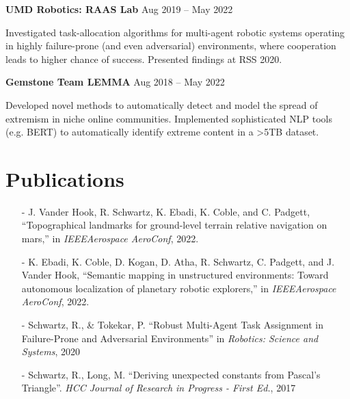 \documentclass[letterpaper,11pt]{article}
\begin{document}
\begin{minipage}[t]{0.42\textwidth}
  \noindent
  \textbf{UMD Robotics: RAAS Lab} \hspace{\fill} Aug 2019 -- May 2022

  \setlength{\parindent}{15pt}
  {\small Investigated task-allocation algorithms for multi-agent robotic systems operating in highly failure-prone (and even adversarial) environments, where cooperation leads to higher chance of success. Presented findings at RSS 2020.}

  \vspace*{6pt}

  \noindent
  \textbf{Gemstone Team LEMMA} \hspace{\fill} Aug 2018 -- May 2022
    
  \setlength{\parindent}{15pt}
  {\small Developed novel methods to automatically detect and model the spread of extremism in niche online communities. Implemented sophisticated NLP tools (e.g. BERT) to automatically identify extreme content in a >5TB dataset. }
\end{minipage}


\section{Publications}
\small{
  \begin{itemize}
      \item[-] J. Vander Hook, R. Schwartz, K. Ebadi, K. Coble, and C. Padgett, ``Topographical landmarks for ground-level terrain relative navigation on mars,'' in \textit{IEEEAerospace AeroConf}, 2022.

      \item[-] K. Ebadi, K. Coble, D. Kogan, D. Atha, R. Schwartz, C. Padgett, and J. Vander Hook, ``Semantic  mapping in unstructured environments:  Toward autonomous localization of planetary robotic explorers,'' in \textit{IEEEAerospace AeroConf}, 2022.

      \item[-] Schwartz, R., \& Tokekar, P. ``Robust Multi-Agent Task Assignment in Failure-Prone and Adversarial Environments'' in \textit{Robotics: Science and Systems}, 2020

      \item[-] Schwartz, R., Long, M. ``Deriving unexpected constants from Pascal's Triangle''. \textit{HCC Journal of Research in Progress - First Ed.}, 2017
  \end{itemize} 
}
\end{document}
